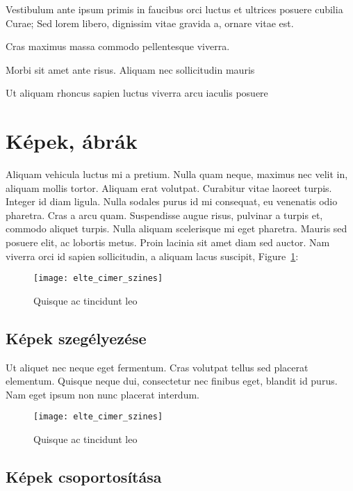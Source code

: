 \bigskip

Vestibulum ante ipsum primis in faucibus orci luctus et ultrices posuere cubilia Curae; Sed lorem libero, dignissim vitae gravida a, ornare vitae est.
\begin{compactdesc}
	\item[Cras maximus] massa commodo pellentesque viverra.
	\item[Morbi sit] amet ante risus. Aliquam nec sollicitudin mauris
	\item[Ut aliquam rhoncus sapien] luctus viverra arcu iaculis posuere
\end{compactdesc}


\section{Képek, ábrák}

Aliquam vehicula luctus mi a pretium. Nulla quam neque, maximus nec velit in, aliquam mollis tortor. Aliquam erat volutpat. Curabitur vitae laoreet turpis. Integer id diam ligula. Nulla sodales purus id mi consequat, eu venenatis odio pharetra. Cras a arcu quam. Suspendisse augue risus, pulvinar a turpis et, commodo aliquet turpis. Nulla aliquam scelerisque mi eget pharetra. Mauris sed posuere elit, ac lobortis metus. Proin lacinia sit amet diam sed auctor. Nam viverra orci id sapien sollicitudin, a aliquam lacus suscipit, Figure~\ref{fig:example-1}:

\begin{figure}[H]
	\centering
	\texttt{[image: elte\_cimer\_szines]}
	\caption{Quisque ac tincidunt leo}
	\label{fig:example-1}
\end{figure}

\subsection{Képek szegélyezése}

Ut aliquet nec neque eget fermentum. Cras volutpat tellus sed placerat elementum. Quisque neque dui, consectetur nec finibus eget, blandit id purus. Nam eget ipsum non nunc placerat interdum.

\begin{figure}[H]
	\centering
	\texttt{[image: elte\_cimer\_szines]}
	\caption{Quisque ac tincidunt leo}
\end{figure}

\subsection{Képek csoportosítása}

